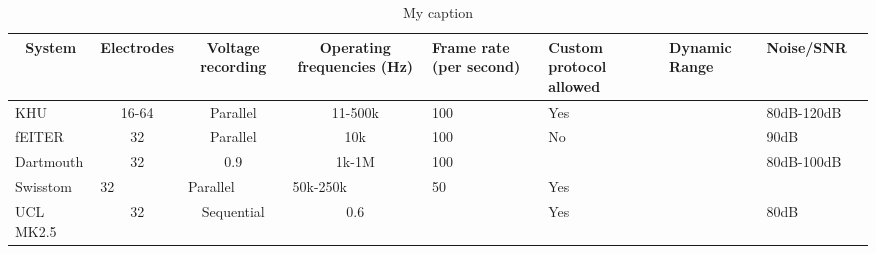 \begin{table}[]
\centering
\caption{My caption}
\label{my-label}
\begin{tabular}{|l|c|c|c|l|l|l|l|l|}
\hline
\multicolumn{1}{|c|}{System} & Electrodes              & Voltage recording             & Operating frequencies (Hz)    & Frame rate (per second) & Custom protocol allowed & Dynamic Range & Noise/SNR  &  \\ \hline
KHU                          & 16-64                   & Parallel                      & 11-500k                       & 100                     & Yes                     &               & 80dB-120dB &  \\ \hline
fEITER                       & 32                      & Parallel                      & 10k                           & 100                     & No                      &               & 90dB       &  \\ \hline
Dartmouth                    & 32                      & 0.9                           & 1k-1M                         & 100                     &                         &               & 80dB-100dB &  \\ \hline
Swisstom                     & \multicolumn{1}{l|}{32} & \multicolumn{1}{l|}{Parallel} & \multicolumn{1}{l|}{50k-250k} & 50                      & Yes                     &               &            &  \\ \hline
UCL MK2.5                    & 32                      & Sequential                    & 0.6                           &                         & Yes                     &               & 80dB       &  \\ \hline
\end{tabular}
\end{table}